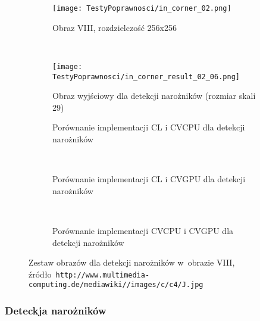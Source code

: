 \begin{figure}[H]

\begin{center}
\begin{subfigure}[t]{0.3\textwidth}
\texttt{[image: TestyPoprawnosci/in\_corner\_02.png]}
\caption{Obraz VIII, rozdzielczość 256x256}
\label{fig:valCorner02}
\end{subfigure}
~
\begin{subfigure}[t]{0.3\textwidth}
\texttt{[image: TestyPoprawnosci/in\_corner\_result\_02\_06.png]}
\caption{Obraz wyjściowy dla detekcji narożników (rozmiar skali 29)}
\label{fig:valCornerResult02}
\end{subfigure}
\end{center}

\begin{subfigure}[t]{0.3\textwidth}
	\centering
	\setlength\fboxsep{0pt}
	\setlength\fboxrule{0.5pt}
	\caption{Porównanie implementacji CL i CVCPU dla detekcji narożników}
	\label{fig:valCorner2CLCVCPU}
\end{subfigure}
~
\begin{subfigure}[t]{0.3\textwidth}
	\centering
	\setlength\fboxsep{0pt}
	\setlength\fboxrule{0.5pt}
	\caption{Porównanie implementacji CL i CVGPU dla detekcji narożników}
	\label{fig:valCorner2CLCVGPU}
\end{subfigure}
~
\begin{subfigure}[t]{0.3\textwidth}
	\centering
	\setlength\fboxsep{0pt}
	\setlength\fboxrule{0.5pt}
	\caption{Porównanie implementacji CVCPU i CVGPU dla detekcji narożników}
	\label{fig:valCorner2CVCPUCVGPU}                 
\end{subfigure}
\caption{Zestaw obrazów dla detekcji narożników w~obrazie VIII, \tiny{źródło~\texttt{http://www.multimedia-computing.de/mediawiki//images/c/c4/J.jpg}}}

\label{fig:valCorner2}
\end{figure}

\subsubsection{Deteckja narożników}
\label{subsubsec:naroznikiRysunki}

